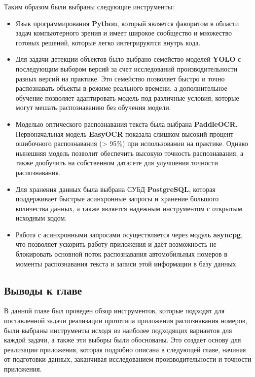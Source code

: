 \documentclass[a4paper,12pt]{article}
\begin{document}
Таким образом были выбраны следующие инструменты:
\begin{itemize}
    \item Язык программирования \textbf{Python}, который является фаворитом в области задач компьютерного зрения и имеет широкое сообщество и множество готовых решений, которые легко интегрируются внутрь кода.
    \item Для задачи детекции объектов было выбрано семейство моделей \textbf{YOLO} с последующим выбором версий за счет исследований производительности разных версий на практике. Это семейство позволяет быстро и точно распознавать объекты в режиме реального времени, а дополнительное обучение позволяет адаптировать модель под различные условия, которые могут мешать распознаванию без обучения модели.
    \item Моделью оптического распознавания текста была выбрана \textbf{PaddleOCR}. Первоначальная модель \textbf{EasyOCR} показала слишком высокий процент ошибочного распознавания (> 95\%) при использовании на практике. Однако нынешняя модель позволит обеспечить высокую точность распознавания, а также дообучить на собственном датасете для улучшения точности распознавания.
    \item Для хранения данных была выбрана СУБД \textbf{PostgreSQL}, которая поддерживает быстрые асинхронные запросы и хранение большого количества данных, а также является надежным инструментом с открытым исходным кодом.
    \item Работа с асинхронными запросами осуществляется через модуль \textbf{asyncpg}, что позволяет ускорить работу приложения и даёт возможность не блокировать основной поток распознавания автомобильных номеров в моменты распознавания текста и записи этой информации в базу данных.
\end{itemize}

\subsection{Выводы к главе}

В данной главе был проведен обзор инструментов, которые подходят для поставленной задачи реализации прототипа приложения распознавания номеров, были выбраны инструменты исходя из наиболее подходящих вариантов для каждой задачи, а также эти выборы были обоснованы. Это создает основу для реализации приложения, которая подробно описана в следующей главе, начиная от подготовки данных, заканчивая исследованием производительности и точности приложения.
\end{document}
